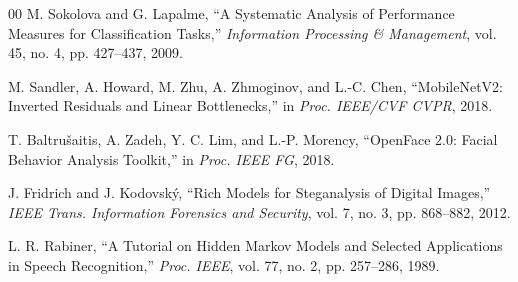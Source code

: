 \documentclass[conference]{IEEEtran}
\begin{document}
\begin{thebibliography}{00}
 M. Sokolova and G. Lapalme, ``A Systematic Analysis of Performance Measures for Classification Tasks,'' \textit{Information Processing \& Management}, vol. 45, no. 4, pp. 427--437, 2009.

 M. Sandler, A. Howard, M. Zhu, A. Zhmoginov, and L.-C. Chen, ``MobileNetV2: Inverted Residuals and Linear Bottlenecks,'' in \textit{Proc. IEEE/CVF CVPR}, 2018.

 T. Baltru\v{s}aitis, A. Zadeh, Y. C. Lim, and L.-P. Morency, ``OpenFace 2.0: Facial Behavior Analysis Toolkit,'' in \textit{Proc. IEEE FG}, 2018.

 J. Fridrich and J. Kodovsk\'y, ``Rich Models for Steganalysis of Digital Images,'' \textit{IEEE Trans. Information Forensics and Security}, vol. 7, no. 3, pp. 868--882, 2012.

 L. R. Rabiner, ``A Tutorial on Hidden Markov Models and Selected Applications in Speech Recognition,'' \textit{Proc. IEEE}, vol. 77, no. 2, pp. 257--286, 1989.

\end{thebibliography}
\vspace{12pt}
\end{document}
